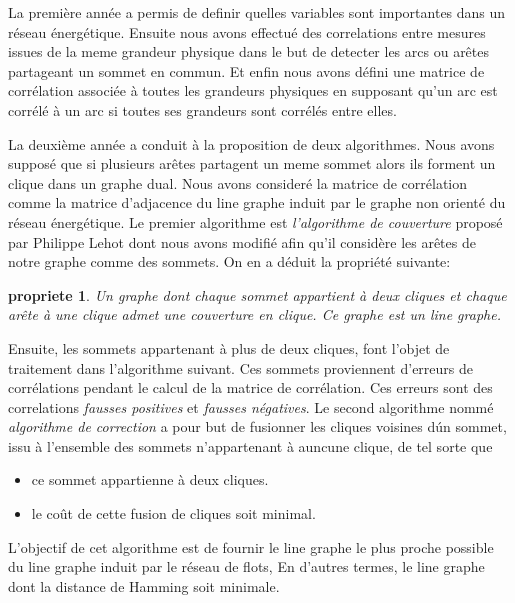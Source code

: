 \documentclass [a4paper,10pt]{article}
\newtheorem{property}{propriete}
\begin{document}
La premi\`ere ann\'ee a permis de definir quelles variables sont importantes dans un r\'eseau \'energ\'etique. Ensuite nous avons effectu\'e des correlations entre mesures issues de la meme grandeur physique dans le but de detecter les arcs ou ar\^etes partageant un sommet en commun. Et enfin nous avons d\'efini une matrice de corr\'elation associ\'ee \`a toutes les grandeurs physiques en supposant qu'un arc est corr\'el\'e \`a un arc si toutes ses grandeurs sont corr\'el\'es entre elles. \newline

La deuxi\`eme ann\'ee a conduit \`a la proposition de deux algorithmes. Nous avons suppos\'e que si plusieurs ar\^etes partagent un meme sommet alors ils forment un clique dans un graphe dual. Nous avons consider\'e la matrice de corr\'elation comme la matrice d'adjacence du line graphe induit par le graphe non orient\'e du r\'eseau \'energ\'etique. \newline
Le premier algorithme est {\em l'algorithme de couverture} propos\'e par Philippe Lehot \cite{decompositionEnCliquesParArcs} dont nous avons modifi\'e afin qu'il consid\`ere les ar\^etes de notre graphe comme des sommets. On en a d\'eduit la propri\'et\'e suivante:
\begin{property}
Un graphe dont chaque sommet appartient \`a deux cliques et chaque ar\^ete \`a une clique admet une couverture en clique. Ce graphe est  un {\em line graphe}.
\end{property}
Ensuite, les sommets appartenant \`a plus de deux cliques, font l'objet de traitement dans l'algorithme suivant. Ces sommets proviennent d'erreurs de corr\'elations pendant le calcul de la matrice de corr\'elation. Ces erreurs sont des correlations {\em fausses positives} et {\em fausses n\'egatives}.\newline
Le second algorithme nomm\'e {\em algorithme de correction} a pour but de fusionner les cliques voisines d\'un sommet, issu \`a l'ensemble des sommets n'appartenant \`a auncune clique, de tel sorte que
\begin{itemize}
 	\item ce sommet appartienne \`a deux cliques.
 	\item le co\^ut de cette fusion de cliques soit minimal.
\end{itemize}
L'objectif de cet algorithme est de fournir le line graphe le plus proche possible du line graphe induit par le r\'eseau de flots, En d'autres termes, le line graphe dont la distance de Hamming soit minimale.   \newline
\end{document}

